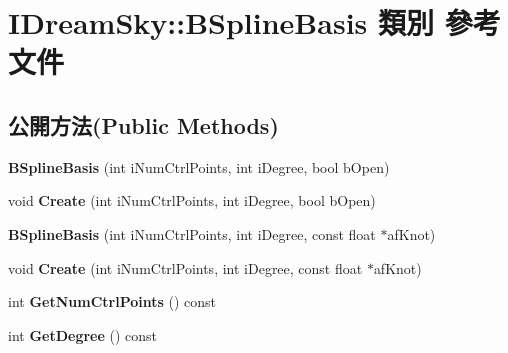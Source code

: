 \hypertarget{class_i_dream_sky_1_1_b_spline_basis}{}\section{I\+Dream\+Sky\+:\+:B\+Spline\+Basis 類別 參考文件}
\label{class_i_dream_sky_1_1_b_spline_basis}
\subsection*{公開方法(Public Methods)}
\begin{DoxyCompactItemize}
\item 
{\bfseries B\+Spline\+Basis} (int i\+Num\+Ctrl\+Points, int i\+Degree, bool b\+Open)\hypertarget{class_i_dream_sky_1_1_b_spline_basis_a677226c827906cbceab08e6e7676472c}{}\label{class_i_dream_sky_1_1_b_spline_basis_a677226c827906cbceab08e6e7676472c}

\item 
void {\bfseries Create} (int i\+Num\+Ctrl\+Points, int i\+Degree, bool b\+Open)\hypertarget{class_i_dream_sky_1_1_b_spline_basis_a0a173370c7924991c1b66b0dda5ea8ca}{}\label{class_i_dream_sky_1_1_b_spline_basis_a0a173370c7924991c1b66b0dda5ea8ca}

\item 
{\bfseries B\+Spline\+Basis} (int i\+Num\+Ctrl\+Points, int i\+Degree, const float $\ast$af\+Knot)\hypertarget{class_i_dream_sky_1_1_b_spline_basis_a7bd0be64ceafb0d77ab8226d221bac5a}{}\label{class_i_dream_sky_1_1_b_spline_basis_a7bd0be64ceafb0d77ab8226d221bac5a}

\item 
void {\bfseries Create} (int i\+Num\+Ctrl\+Points, int i\+Degree, const float $\ast$af\+Knot)\hypertarget{class_i_dream_sky_1_1_b_spline_basis_a871e574dbb18dbf3c3f39d94541df56b}{}\label{class_i_dream_sky_1_1_b_spline_basis_a871e574dbb18dbf3c3f39d94541df56b}

\item 
int {\bfseries Get\+Num\+Ctrl\+Points} () const \hypertarget{class_i_dream_sky_1_1_b_spline_basis_ad009e013af116834c42f5320a9175661}{}\label{class_i_dream_sky_1_1_b_spline_basis_ad009e013af116834c42f5320a9175661}

\item 
int {\bfseries Get\+Degree} () const \hypertarget{class_i_dream_sky_1_1_b_spline_basis_adb4900194ac7e4b6032d3a059d5890fc}{}\label{class_i_dream_sky_1_1_b_spline_basis_adb4900194ac7e4b6032d3a059d5890fc}


\end{DoxyCompactItemize}
